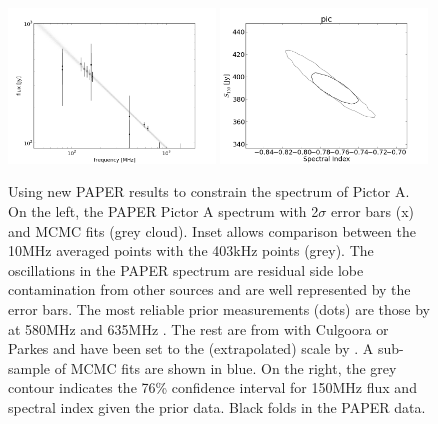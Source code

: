 \documentclass[preprint]{aastex}
\begin{document}
\begin{figure}[htbp]
\includegraphics[width=0.49\textwidth]{plots/pictor_spectrum.png}
\includegraphics[width=0.49\textwidth]{plots/pic_SI_MCMC.png}
\caption{
Using new PAPER results to constrain the spectrum of Pictor A.  On the left,
the PAPER Pictor A spectrum with 2$\sigma$ error bars (x) and  MCMC fits (grey
cloud). Inset allows comparison between the 10MHz averaged points with the
403kHz points (grey). The oscillations in the PAPER spectrum are residual side
lobe contamination from other sources and are well represented by the error
bars.  The most reliable prior measurements (dots) are those by
\cite{Wills:1975p9314} at 580MHz and 635MHz \citep{Perley:1997p9312}. The rest
are from with Culgoora \cite{Slee:1995p7541} or Parkes
\cite{Otrupcek:1991p8780} and have been set to the (extrapolated)
\citet{Baars:1977p9678} scale by  \cite{Kuehr:1981p9628}. A sub-sample of MCMC
fits are shown in blue. On the right, the grey contour indicates the 76\%
confidence interval for 150MHz flux and spectral index given the prior data.
Black folds in the PAPER data.
} \label{fig:pic_spectrum}
\end{figure}

%
%
\end{document}
